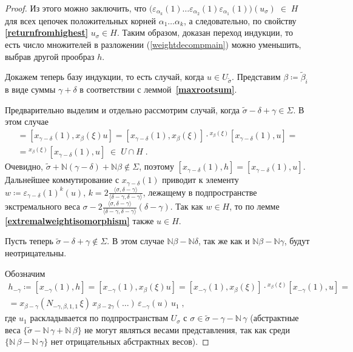 \documentclass[12pt]{matmex-diploma}
\theoremstyle{mystyleni}
\theoremstyle{mystyle}
\newcommand\refb[1]{\textbf{\ref{#1}}}
\newcommand{\N}{\mathbb{N}}
\begin{document}
\begin{proof}
Из этого можно заключить, что $\big(\varepsilon_{\alpha_k}(1)\ldots\varepsilon_{\alpha_2}(1)\varepsilon_{\alpha_1}(1)\big)(u_\sigma) \; \in \; H$ для всех цепочек положительных корней $\alpha_1\ldots\alpha_k$, а следовательно, по свойству \refb{returnfromhighest} $u_\sigma \in H$. Таким образом, доказан переход индукции, то есть число множителей в разложении (\ref{weightdecompmain}) можно уменьшить, выбрав другой прообраз $h$.

Докажем теперь базу индукции, то есть случай, когда $u \in  U_{\widetilde\sigma}$.
Представим $\beta\coloneqq\widetilde\beta_i$ в виде суммы $\gamma+\delta$ в соответствии с леммой~\refb{maxrootsum}.

\pagebreak


Предварительно выделим и отдельно рассмотрим случай, когда $\widetilde\sigma-\delta+\gamma \in \Sigma$. В этом случае
\begin{multline*}
[x_{\gamma-\delta}(1),h] = [x_{\gamma-\delta}(1),x_\beta(\xi)u] = [x_{\gamma-\delta}(1),x_\beta(\xi)] \cdot {}^{x_\beta(\xi)}[x_{\gamma-\delta}(1),u] =\\=
{}^{x_\beta(\xi)}[x_{\gamma-\delta}(1),u] \;\in\; U\cap H \;.
\end{multline*}
Очевидно, $\widetilde\sigma + \N(\gamma-\delta)+\N\beta \notin \Sigma$, поэтому
$[x_{\gamma-\delta}(1),h] = [x_{\gamma-\delta}(1),u]$. Дальнейшее коммутирование с $x_{\gamma-\delta}(1)$ приводит к элементу $w\coloneqq\varepsilon_{\gamma-\delta}(1)^k(u)$, $k=2\frac{\langle\sigma,\delta-\gamma\rangle}{\langle\delta-\gamma,\delta-\gamma\rangle}$, лежащему в подпространстве экстремального веса $\sigma-2\frac{\langle\sigma,\delta-\gamma\rangle}{\langle\delta-\gamma,\delta-\gamma\rangle}(\delta-\gamma)$. Так как $w\in H$, то по лемме \refb{extremalweightisomorphism} также $u \in H$.

Пусть теперь $\widetilde\sigma-\delta+\gamma \notin \Sigma$. В этом случае $\N\beta-\N\delta$, так же как и $\N\beta-\N\gamma$, будут неотрицательны.

Обозначим
\begin{multline*}
h_{-\gamma} \coloneqq [x_{-\gamma}(1),h] = [x_{-\gamma}(1),x_\beta(\xi) u] = [x_{-\gamma}(1),x_\beta(\xi)] \cdot {}^{x_\beta(\xi)}[x_{-\gamma}(1),u] = \\ =
x_{\beta-\gamma}(N_{-\gamma,\beta,1,1} \,\xi) \, x_{\beta-2\gamma}(\ldots) \, \varepsilon_{-\gamma}(u) \, u_1 \; ,
\end{multline*}
где $u_1$ раскладывается по подпространствам $U_\sigma$ с $\sigma \in \widetilde\sigma-\gamma - \N \, \gamma$ (абстрактные веса $\{\widetilde\sigma-\N\,\gamma+\N\,\beta\}$ не могут являться весами представления, так как среди $\{\N\,\beta-\N\,\gamma\}$ нет отрицательных абстрактных весов).


\end{proof}
\end{document}
